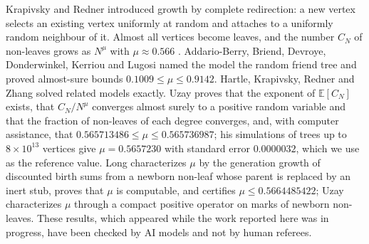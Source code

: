 \documentclass[11pt]{article}
\theoremstyle{plain}
\theoremstyle{definition}
\theoremstyle{remark}
\begin{document}
Krapivsky and Redner \cite{KR2017} introduced growth by complete redirection: a new vertex selects an existing vertex uniformly at random and attaches to a uniformly random neighbour of it. Almost all vertices become leaves, and the number $C_N$ of non-leaves grows as $N^{\mu}$ with $\mu\approx0.566$ \cite{KR2017,KR2023}. Addario-Berry, Briend, Devroye, Donderwinkel, Kerriou and Lugosi \cite{ABDDKL} named the model the random friend tree and proved almost-sure bounds $0.1009\le\mu\le0.9142$. Hartle, Krapivsky, Redner and Zhang \cite{HKRZ2026} solved related models exactly. Uzay \cite{Uzay2026,UzayR3} proves that the exponent of $\mathbb{E}[C_N]$ exists, that $C_N/N^\mu$ converges almost surely to a positive random variable and that the fraction of non-leaves of each degree converges, and, with computer assistance, that $0.565713486\le\mu\le0.565736987$; his simulations of trees up to $8\times10^{13}$ vertices give $\mu=0.5657230$ with standard error $0.0000032$, which we use as the reference value. Long \cite{LongKernel} characterizes $\mu$ by the generation growth of discounted birth sums from a newborn non-leaf whose parent is replaced by an inert stub, proves that $\mu$ is computable, and certifies $\mu\le0.5664485422$; Uzay \cite{UzayR3} characterizes $\mu$ through a compact positive operator on marks of newborn non-leaves. These results, which appeared while the work reported here was in progress, have been checked by AI models and not by human referees.
\end{document}
